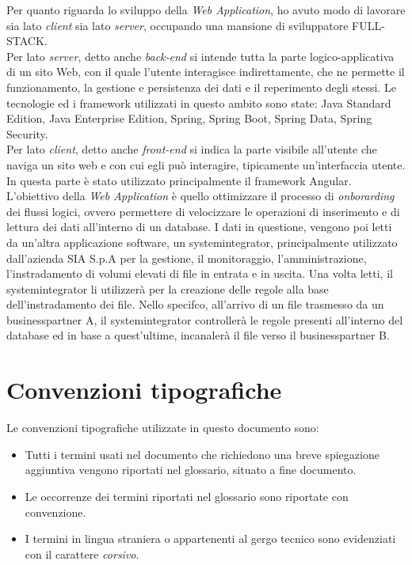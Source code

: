 Per quanto riguarda lo sviluppo della \textit{Web Application}, ho avuto modo di lavorare sia lato \textit{client} sia lato \textit{server}, occupando una mansione di sviluppatore \gls{FULL-STACK}. \\
Per lato \textit{server}, detto anche \textit{back-end} si intende tutta la parte logico-applicativa di un sito Web, con il quale l'utente interagisce indirettamente, che ne permette il funzionamento, la gestione e persistenza dei dati
e il reperimento degli stessi. Le tecnologie ed i \gls{framework} utilizzati in questo ambito sono state: Java Standard Edition, Java Enterprise Edition, Spring, Spring
Boot, Spring Data, Spring Security.\\
Per lato \textit{client}, detto anche \textit{front-end} si indica la parte visibile all’utente che naviga un sito web e con cui egli può interagire, tipicamente un’interfaccia utente. In questa parte è stato utilizzato principalmente il \gls{framework} Angular.\\
L'obiettivo della \textit{Web Application} è quello ottimizzare il processo di \textit{onborarding} dei flussi logici, ovvero permettere di velocizzare le operazioni di inserimento e di lettura dei dati all'interno di un database. I dati in questione, vengono poi letti da un'altra applicazione software, un \gls{systemintegrator}, principalmente utilizzato dall'azienda SIA S.p.A per la gestione, il monitoraggio, l'amministrazione, l'instradamento di volumi elevati di file in entrata e in uscita. Una volta letti, il \gls{systemintegrator} li utilizzerà per la creazione delle regole alla base dell'instradamento dei file. Nello specifco, all'arrivo di un file trasmesso da un \gls{businesspartner} A, il \gls{systemintegrator} controllerà le regole presenti all'interno del database ed in base a quest'ultime, incanalerà il file verso il \gls{businesspartner} B. 

\section{Convenzioni tipografiche}
Le convenzioni tipografiche utilizzate in questo documento sono:
\begin{itemize}
    \item Tutti i termini usati nel documento che richiedono una breve spiegazione aggiuntiva vengono riportati nel glossario, situato a fine documento.
    \item Le occorrenze dei termini riportati nel glossario sono riportate con  \color{black}convenzione.
    \item I termini in lingua straniera o appartenenti al gergo tecnico sono evidenziati con il carattere \textit{corsivo}.
    
\end{itemize}






